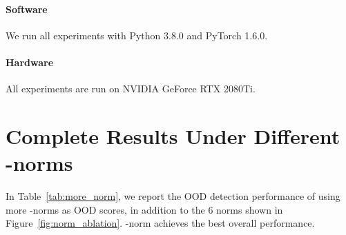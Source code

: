 \documentclass{article}
\begin{document}
\paragraph{Software} We run all experiments with Python 3.8.0 and PyTorch 1.6.0.
\paragraph{Hardware} All experiments are run on NVIDIA GeForce RTX 2080Ti.














\section{Complete Results Under Different -norms}
\label{app:more_norm}
In Table~\ref{tab:more_norm}, we report the OOD detection performance of using more -norms as OOD scores, in addition to the 6 norms shown in Figure~\ref{fig:norm_ablation}. -norm achieves the best overall performance.
\end{document}
